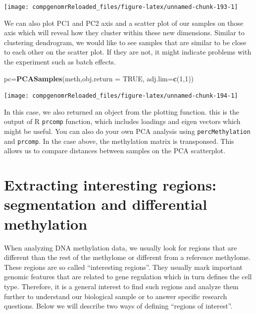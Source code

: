 \documentclass[12pt,]{krantz}
\newenvironment{Shaded}{\begin{snugshade}}{\end{snugshade}}
\newcommand{\DataTypeTok}[1]{\textcolor[rgb]{0.13,0.29,0.53}{#1}}
\newcommand{\DecValTok}[1]{\textcolor[rgb]{0.00,0.00,0.81}{#1}}
\newcommand{\KeywordTok}[1]{\textcolor[rgb]{0.13,0.29,0.53}{\textbf{#1}}}
\newcommand{\NormalTok}[1]{#1}
\newcommand{\OtherTok}[1]{\textcolor[rgb]{0.56,0.35,0.01}{#1}}
\begin{document}
\begin{center}\texttt{[image: compgenomrReloaded\_files/figure-latex/unnamed-chunk-193-1]} \end{center}

We can also plot PC1 and PC2 axis and a scatter plot of our samples on those axis which will reveal how they cluster within these new dimensions. Similar to clustering dendrogram, we would like to see samples that are similar to be close to each other on the scatter plot. If they are not, it might indicate problems with the experiment such as batch effects.

\begin{Shaded}
\begin{Highlighting}[]
\NormalTok{pc=}\KeywordTok{PCASamples}\NormalTok{(meth,}\DataTypeTok{obj.return =} \OtherTok{TRUE}\NormalTok{, }\DataTypeTok{adj.lim=}\KeywordTok{c}\NormalTok{(}\DecValTok{1}\NormalTok{,}\DecValTok{1}\NormalTok{))}
\end{Highlighting}
\end{Shaded}

\begin{center}\texttt{[image: compgenomrReloaded\_files/figure-latex/unnamed-chunk-194-1]} \end{center}

In this case, we also returned an object from the plotting function. this is the output of R \texttt{prcomp} function, which includes loadings and eigen vectors which might be useful. You can also do your own PCA analysis using \texttt{percMethylation} and \texttt{prcomp}. In the case above, the methylation matrix is transponsed. This allows us to compare distances between samples on the PCA scatterplot.

\hypertarget{extracting-interesting-regions-segmentation-and-differential-methylation}{%
\section{Extracting interesting regions: segmentation and differential methylation}\label{extracting-interesting-regions-segmentation-and-differential-methylation}}

When analyzing DNA methylation data, we usually look for regions that are different than the rest of the methylome or different from a reference methylome. These regions are so called ``interesting regions''. They usually mark important genomic features that are related to gene regulation which in turn defines the cell type. Therefore, it is a general interest to find such regions and analyze them further to understand our biological sample or to answer specific research questions. Below we will describe two ways of defining ``regions of interest''.
\end{document}
